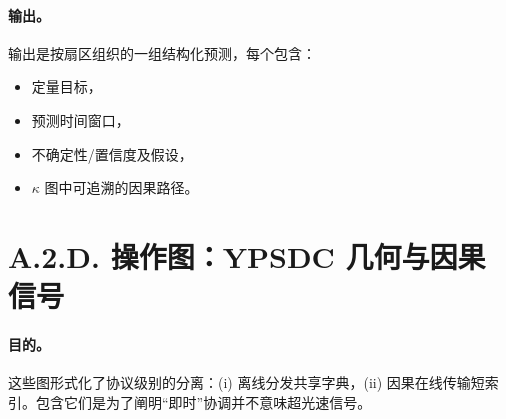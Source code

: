 \documentclass[11pt,a4paper]{article}
\begin{document}
	\paragraph{输出。}
	输出是按扇区组织的一组结构化预测，每个包含：
	\begin{itemize}[leftmargin=*]
		\item 定量目标，
		\item 预测时间窗口，
		\item 不确定性/置信度及假设，
		\item $\kappa$ 图中可追溯的因果路径。
	\end{itemize}
	
	\section*{A.2.D. 操作图：YPSDC 几何与因果信号}
	
	\paragraph{目的。}
	这些图形式化了协议级别的分离：(i) 离线分发共享字典，(ii) 因果在线传输短索引。包含它们是为了阐明“即时”协调并不意味超光速信号。
	
\end{document}
